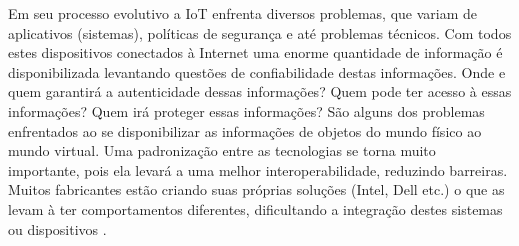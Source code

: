 Em seu processo evolutivo a IoT enfrenta diversos problemas, que variam de aplicativos (sistemas), políticas de segurança e até problemas técnicos. Com todos estes dispositivos conectados à Internet uma enorme quantidade de informação é disponibilizada levantando questões de confiabilidade destas informações. Onde e quem garantirá a autenticidade dessas informações? Quem pode ter acesso à essas informações? Quem irá proteger essas informações? São alguns dos problemas enfrentados ao se disponibilizar as informações de objetos do mundo físico ao mundo virtual. Uma padronização entre as tecnologias se torna muito importante, pois ela levará a uma melhor interoperabilidade, reduzindo barreiras. Muitos fabricantes estão criando suas próprias soluções (Intel, Dell etc.) o que as levam à ter comportamentos diferentes, dificultando a integração destes sistemas ou dispositivos \cite{IEEEORG, CMSWIRE}.